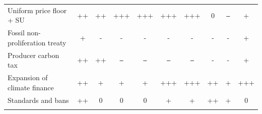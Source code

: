 \documentclass[12pt,english]{article}
\begin{document}
\begin{table}
{\begin{tabular}[t]{lccccccccc}
  Uniform price floor + SU  & ++ & ++ & +++ & +++ & +++ & +++ & 0 & \texttt{--} & + \\   
  Fossil non-proliferation treaty  & + & - & - & - & - & - & - & - & + \\   
  Producer carbon tax  & ++ & ++ & \texttt{--} & \texttt{---} & \texttt{---} & \texttt{--} & - & - & + \\   
  Expansion of climate finance  & ++ & + & + & + & +++ & +++ & ++ & + & +++ \\   
  Standards and bans  & ++ & 0 & 0 & 0 & + & + & ++ & + & 0 \\   
  \bottomrule\\[-0.81em]
\end{tabular}}
\end{table}





% 
\end{document}
